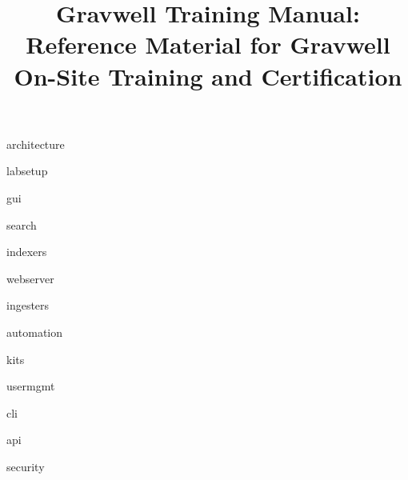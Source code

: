 \documentclass[]{report}
\date{}
\newcommand{\titlepicture}[2][]{%
  \renewcommand\placetitlepicture{%
    \texttt{[image: \#2]}\par\medskip
  }%
}
\newcommand{\placetitlepicture}{} %
\begin{document}
\titlepicture{img/logo.png}
\title{Gravwell Training Manual: Reference Material for Gravwell On-Site Training and Certification}
\maketitle

\newpage

\tableofcontents
\newpage




{architecture}

{labsetup}

{gui}

{search}

{indexers}

{webserver}

{ingesters}

{automation}

{kits}

{usermgmt}

{cli}

{api}

{security}

\end{document}
